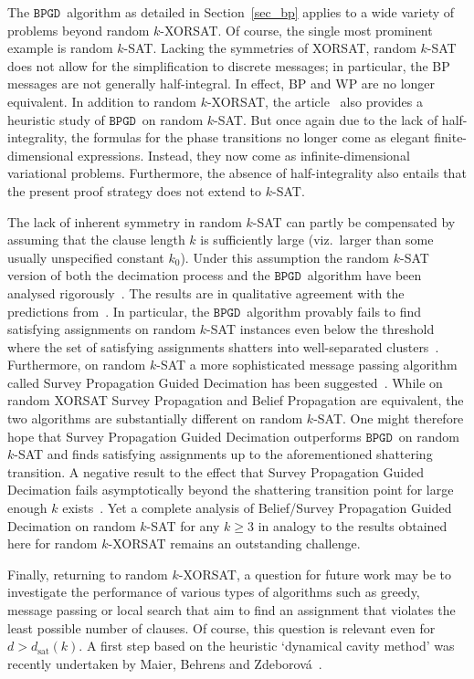 \documentclass[10pt,reqno]{amsart}
\numberwithin{equation}{section}
\newcommand\dsat{d_{\mathrm{sat}}}
\newcommand{\BPGD}{\ensuremath{\mathtt{BPGD}}}
\newcommand\Sec{Section}
\begin{document}
The \BPGD\ algorithm as detailed in \Sec~\ref{sec_bp} applies to a wide variety of problems beyond random $k$-XORSAT.
Of course, the single most prominent example is random $k$-SAT.
Lacking the symmetries of XORSAT, random $k$-SAT does not allow for the simplification to discrete messages; in particular, the BP messages are not generally half-integral.
In effect, BP and WP are no longer equivalent.
In addition to random $k$-XORSAT, the article~\cite{RTS} also provides a heuristic study of \BPGD\ on random $k$-SAT.
But once again due to the lack of half-integrality, the formulas for the phase transitions no longer come as elegant finite-dimensional expressions.
Instead, they now come as infinite-dimensional variational problems.
Furthermore, the absence of half-integrality also entails that the present proof strategy does not extend to $k$-SAT.

The lack of inherent symmetry in random $k$-SAT can partly be compensated by assuming that the clause length $k$ is sufficiently large (viz.\ larger than some usually unspecified constant $k_0$).
Under this assumption the random $k$-SAT version of both the decimation process and the \BPGD\ algorithm have been analysed rigorously~\cite{BP,Angelica}.
The results are in qualitative agreement with the predictions from~\cite{RTS}.
In particular, the \BPGD\ algorithm provably fails to find satisfying assignments on random $k$-SAT instances even below the threshold where the set of satisfying assignments shatters into well-separated clusters~\cite{Barriers,pnas}.
Furthermore, on random $k$-SAT a more sophisticated message passing algorithm called Survey Propagation Guided Decimation has been suggested~\cite{MPZ,RTS}.
While on random XORSAT Survey Propagation and Belief Propagation are equivalent, the two algorithms are substantially different on random $k$-SAT.
One might therefore hope that Survey Propagation Guided Decimation outperforms \BPGD\ on random $k$-SAT and finds satisfying assignments up to the aforementioned shattering transition.
A negative result to the effect that Survey Propagation Guided Decimation fails asymptotically beyond the shattering transition point for large enough $k$ exists~\cite{Hetterich}.
Yet a complete analysis of Belief/Survey Propagation Guided Decimation on random $k$-SAT for any $k\geq3$ in analogy to the results obtained here for random $k$-XORSAT remains an outstanding challenge.

Finally, returning to random $k$-XORSAT, a question for future work may be to investigate the performance of various types of algorithms such as greedy, message passing or local search that aim to find an assignment that violates the least possible number of clauses.
Of course, this question is relevant even for $d>\dsat(k)$.
A first step based on the heuristic `dynamical cavity method' was recently undertaken by Maier, Behrens and Zdeborov\'a~\cite{MBZ}.
\end{document}
